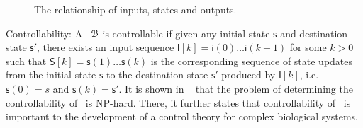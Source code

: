 
\begin{figure}[!t]
      \centering
      
      \caption{The relationship of inputs, states and outputs.}
      \label{fig:10}
  \end{figure}



Controllability: %
A \BCN\ ${\mathcal{B}}$ is controllable if given any initial state $\mathsf{s}$ and destination state $\mathsf{s}'$, there exists an input sequence $\mathsf{I}[k]=\mathsf{i}(0)\ldots\mathsf{i}(k-1)$ for some $k>0$ such that $\mathsf{S}[k]=\mathsf{s}(1)\ldots\mathsf{s}(k)$ is the corresponding sequence of state updates from the initial state $\mathsf{s}$ to the destination state $\mathsf{s}'$ produced by $\mathsf{I}[k]$, i.e. $\mathsf{s}(0)=s$ and $\mathsf{s}(k)=\mathsf{s}'$. It is shown in ~\cite{Akutsu2007Control} that the problem of determining the controllability of \BCNs\ is {NP}-hard. There, it further states that controllability of \BCNs\ is important to the development of a control theory for complex biological systems.
%

